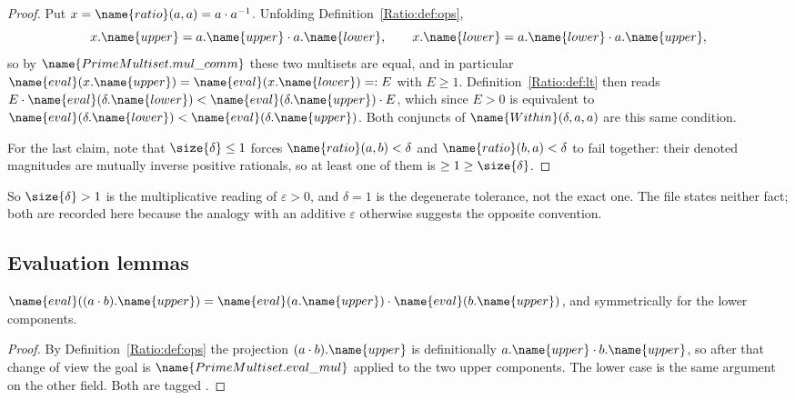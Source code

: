 \begin{proof}
Put $x = \name{ratio}(a, a) = a \cdot a^{-1}$.  Unfolding
Definition~\ref{Ratio:def:ops},
\[
  x.\name{upper} = a.\name{upper} \cdot a.\name{lower},
  \qquad
  x.\name{lower} = a.\name{lower} \cdot a.\name{upper},
\]
so by $\name{PrimeMultiset.mul\_comm}$ these two multisets are equal, and in
particular $\name{eval}(x.\name{upper}) = \name{eval}(x.\name{lower}) =: E$
with $E \geq 1$.  Definition~\ref{Ratio:def:lt} then reads
$E \cdot \name{eval}(\delta.\name{lower}) <
  \name{eval}(\delta.\name{upper}) \cdot E$,
which since $E > 0$ is equivalent to
$\name{eval}(\delta.\name{lower}) < \name{eval}(\delta.\name{upper})$.  Both
conjuncts of $\name{Within}(\delta, a, a)$ are this same condition.

For the last claim, note that $\size{\delta} \leq 1$ forces
$\name{ratio}(a,b) < \delta$ and $\name{ratio}(b,a) < \delta$ to fail
together: their denoted magnitudes are mutually inverse positive rationals, so
at least one of them is $\geq 1 \geq \size{\delta}$.
\end{proof}

So $\size{\delta} > 1$ is the multiplicative reading of $\varepsilon > 0$, and
$\delta = 1$ is the degenerate tolerance, not the exact one.  The file states
neither fact; both are recorded here because the analogy with an additive
$\varepsilon$ otherwise suggests the opposite convention.

\subsection{Evaluation lemmas}
\label{Ratio:sec:eval}

\begin{lemma}\label{Ratio:lem:upper-mul}
$\name{eval}((a \cdot b).\name{upper})
  = \name{eval}(a.\name{upper}) \cdot \name{eval}(b.\name{upper})$,
and symmetrically  for the lower components.
\end{lemma}

\begin{proof}
By Definition~\ref{Ratio:def:ops} the projection
$(a \cdot b).\name{upper}$ is definitionally
$a.\name{upper} \cdot b.\name{upper}$, so after that change of view the goal
is $\name{PrimeMultiset.eval\_mul}$ applied to the two upper components.
The lower case is the same argument on the other field.  Both are tagged
.
\end{proof}


